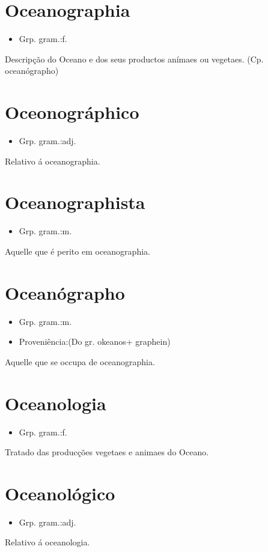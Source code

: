 \section{Oceanographia}
\begin{itemize}
\item {Grp. gram.:f.}
\end{itemize}
Descripção do Oceano e dos seus productos anímaes ou vegetaes.
(Cp. \textunderscore oceanógrapho\textunderscore )
\section{Oceonográphico}
\begin{itemize}
\item {Grp. gram.:adj.}
\end{itemize}
Relativo á oceanographia.
\section{Oceanographista}
\begin{itemize}
\item {Grp. gram.:m.}
\end{itemize}
Aquelle que é perito em oceanographia.
\section{Oceanógrapho}
\begin{itemize}
\item {Grp. gram.:m.}
\end{itemize}
\begin{itemize}
\item {Proveniência:(Do gr. \textunderscore okeanos\textunderscore  + \textunderscore graphein\textunderscore )}
\end{itemize}
Aquelle que se occupa de oceanographia.
\section{Oceanologia}
\begin{itemize}
\item {Grp. gram.:f.}
\end{itemize}
Tratado das producções vegetaes e animaes do Oceano.
\section{Oceanológico}
\begin{itemize}
\item {Grp. gram.:adj.}
\end{itemize}
Relativo á oceanologia.
